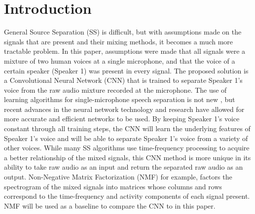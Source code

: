 \documentclass[12pt,chapterheads]{ucsd}
\begin{document}
%







%   
%   
%


\section{Introduction}
\label{sec:intro}
General Source Separation (SS) is difficult, but with assumptions made on the signals that are present and their mixing methods, it becomes a much more tractable problem. In this paper, assumptions were made that all signals were a mixture of two human voices at a single microphone, and that the voice of  a certain speaker (Speaker 1) was present in every signal. The proposed solution is a Convolutional Neural Network (CNN) that is trained to separate Speaker 1's voice from the raw audio mixture recorded at the microphone. The use of learning algorithms for single-microphone speech separation is not new \cite{roweis2001one}, but recent advances in the neural network technology and research have allowed for more accurate and efficient networks to be used. By keeping Speaker 1's voice constant through all training steps, the CNN will learn the underlying features of Speaker 1's voice and will be able to separate Speaker 1's voice from a variety of other voices. While many SS algorithms use time-frequency processing to acquire a better relationship of the mixed signals, this CNN method is more unique in its ability to take raw audio as an input and return the separated raw audio as an output. Non-Negative Matrix Factorization (NMF) for example, factors the spectrogram of the mixed signals into matrices whose columns and rows correspond to the time-frequency and activity components of each signal present. NMF will be used as a baseline to compare the CNN to in this paper.
\end{document}
